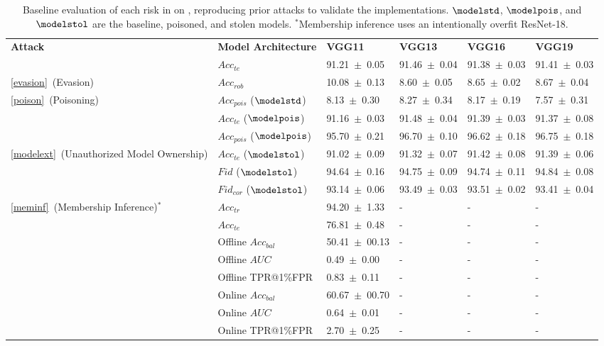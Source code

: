 \begin{table}[htb]
    \centering
    \footnotesize
    \caption{Baseline evaluation of each risk in \method on \celeba, reproducing prior attacks to validate the implementations. $\modelstd$, $\modelpois$, and $\modelstol$ are the baseline, poisoned, and stolen models. $^{*}$Membership inference uses an intentionally overfit ResNet-18.}
    \label{tab:attack_results}
    \begin{tabularx}{\textwidth}{l l X X X X}
        \toprule
        \multirow{2}{*}{\textbf{Attack}} & \textbf{Model Architecture} & \textbf{VGG11} & \textbf{VGG13} & \textbf{VGG16} & \textbf{VGG19} \\
            & $Acc_{te}$ & 91.21~$\pm$~0.05 & 91.46~$\pm$~0.04 & 91.38~$\pm$~0.03 & 91.41~$\pm$~0.03 \\
        \midrule

        \ref{evasion}~(Evasion) & $Acc_{rob}$ & 10.08~$\pm$~0.13 & 8.60~$\pm$~0.05 & 8.65~$\pm$~0.02 & 8.67~$\pm$~0.04 \\
        \midrule

        \multirow{3}{*}{\ref{poison}~(Poisoning)}
            &  $Acc_{pois}$ ($\modelstd$) & 8.13~$\pm$~0.30 & 8.27~$\pm$~0.34 & 8.17~$\pm$~0.19 & 7.57~$\pm$~0.31 \\
            & $Acc_{te}$ ($\modelpois$) & 91.16~$\pm$~0.03 & 91.48~$\pm$~0.04 & 91.39~$\pm$~0.03 & 91.37~$\pm$~0.08 \\
            & $Acc_{pois}$ ($\modelpois$) & 95.70~$\pm$~0.21 & 96.70~$\pm$~0.10 & 96.62~$\pm$~0.18 & 96.75~$\pm$~0.18 \\
        \midrule

        \multirow{3}{*}{\ref{modelext}~(Unauthorized Model Ownership)}
            &  $Acc_{te}$ ($\modelstol$) & 91.02~$\pm$~0.09 & 91.32~$\pm$~0.07 & 91.42~$\pm$~0.08 & 91.39~$\pm$~0.06 \\
            & $Fid$ ($\modelstol$) & 94.64~$\pm$~0.16 & 94.75~$\pm$~0.09 & 94.74~$\pm$~0.11 & 94.84~$\pm$~0.08 \\
            & $Fid_{cor}$ ($\modelstol$) & 93.14~$\pm$~0.06 & 93.49~$\pm$~0.03 & 93.51~$\pm$~0.02 & 93.41~$\pm$~0.04 \\
        \midrule

        \multirow{8}{*}{\ref{meminf}~(Membership Inference)$^{*}$}
            & $Acc_{tr}$ & 94.20~$\pm$~1.33 & - & - & - \\
            & $Acc_{te}$ & 76.81~$\pm$~0.48 & - & - & - \\
            & Offline $Acc_{bal}$ & 50.41~$\pm$~00.13 & - & - & - \\
            & Offline $AUC$ & 0.49~$\pm$~0.00 & - & - & - \\
            & Offline TPR@1\%FPR & 0.83~$\pm$~0.11 & - & - & - \\
            & Online $Acc_{bal}$ & 60.67~$\pm$~00.70 & - & - & - \\
            & Online $AUC$ & 0.64~$\pm$~0.01 & - & - & - \\
            & Online TPR@1\%FPR & 2.70~$\pm$~0.25 & - & - & - \\
        \midrule


\end{tabularx}
\end{table}
